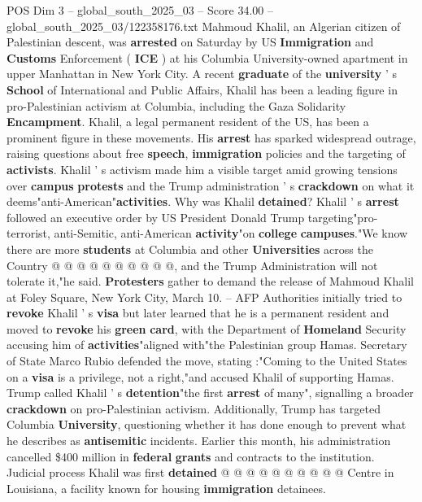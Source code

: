\begin{textsample}{POS Dim 3 – global\_south\_2025\_03 – Score 34.00 – global\_south\_2025\_03/122358176.txt}  \label{ex:f3_pos_031}
Mahmoud Khalil, an Algerian citizen of Palestinian descent, was \textbf{arrested} on Saturday by US \textbf{Immigration} and \textbf{Customs} Enforcement ( \textbf{ICE} ) at his Columbia University-owned apartment in upper Manhattan in New York City.
A recent \textbf{graduate} of the \textbf{university} ' s \textbf{School} of International and Public Affairs, Khalil has been a leading figure in pro-Palestinian activism at Columbia, including the Gaza Solidarity \textbf{Encampment}.
Khalil, a legal permanent resident of the US, has been a prominent figure in these movements.
His \textbf{arrest} has sparked widespread outrage, raising questions about free \textbf{speech}, \textbf{immigration} policies and the targeting of \textbf{activists}.
Khalil ' s activism made him a visible target amid growing tensions over \textbf{campus} \textbf{protests} and the Trump administration ' s \textbf{crackdown} on what it deems"anti-American"\textbf{activities}.
Why was Khalil \textbf{detained}?
Khalil ' s \textbf{arrest} followed an executive order by US President Donald Trump targeting"pro-terrorist, anti-Semitic, anti-American \textbf{activity}"on \textbf{college} \textbf{campuses}."We know there are more \textbf{students} at Columbia and other \textbf{Universities} across the Country @ @ @ @ @ @ @ @ @ @, and the Trump Administration will not tolerate it,"he said. \textbf{Protesters} gather to demand the release of Mahmoud Khalil at Foley Square, New York City, March 10. -- AFP Authorities initially tried to \textbf{revoke} Khalil ' s \textbf{visa} but later learned that he is a permanent resident and moved to \textbf{revoke} his \textbf{green} \textbf{card}, with the Department of \textbf{Homeland} Security accusing him of \textbf{activities}"aligned with"the Palestinian group Hamas.
Secretary of State Marco Rubio defended the move, stating :"Coming to the United States on a \textbf{visa} is a privilege, not a right,"and accused Khalil of supporting Hamas.
Trump called Khalil ' s \textbf{detention}"the first \textbf{arrest} of many", signalling a broader \textbf{crackdown} on pro-Palestinian activism.
Additionally, Trump has targeted Columbia \textbf{University}, questioning whether it has done enough to prevent what he describes as \textbf{antisemitic} incidents.
Earlier this month, his administration cancelled \$400 million in \textbf{federal} \textbf{grants} and contracts to the institution.
Judicial process Khalil was first \textbf{detained} @ @ @ @ @ @ @ @ @ @ Centre in Louisiana, a facility known for housing \textbf{immigration} detainees.

\end{textsample}
